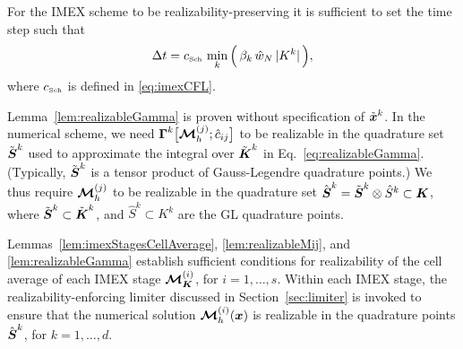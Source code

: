 \begin{rem}
  For the IMEX scheme to be realizability-preserving it is sufficient to set the time step such that
  \begin{equation}
    \Delta t = c_{\mbox{\tiny Sch}}\,\min_{k} \Big(\, \beta_{k}\,\hat{w}_{N}\,|K^{k}| \,\Big),
    \label{eq:imexTimeStep}
  \end{equation}
  where $c_{\mbox{\tiny Sch}}$ is defined in \eqref{eq:imexCFL}.  
\end{rem}

\begin{rem}
  Lemma~\eqref{lem:realizableGamma} is proven without specification of $\tilde{\boldsymbol{x}}^{k}$.  
  In the numerical scheme, we need $\boldsymbol{\Gamma}^{k}\big[\boldsymbol{\mathcal{M}}_{h}^{(j)};\hat{c}_{ij}\big]$ to be realizable in the quadrature set $\tilde{\boldsymbol{S}}^{k}$ used to approximate the integral over $\tilde{\boldsymbol{K}}^{k}$ in Eq.~\eqref{eq:realizableGamma}.  
  (Typically, $\tilde{\boldsymbol{S}}^{k}$ is a tensor product of Gauss-Legendre quadrature points.)  
  We thus require $\boldsymbol{\mathcal{M}}_{h}^{(j)}$ to be realizable in the quadrature set $\hat{\boldsymbol{S}}^{k}=\tilde{\boldsymbol{S}}^{k}\otimes\hat{S}^{k}\subset\boldsymbol{K}$, where $\tilde{\boldsymbol{S}}^{k}\subset\tilde{\boldsymbol{K}}^{k}$, and $\hat{S}^{k}\subset K^{k}$ are the GL quadrature points.  
\end{rem}

\begin{rem}
  Lemmas~\ref{lem:imexStagesCellAverage}, \ref{lem:realizableMij}, and \ref{lem:realizableGamma} establish sufficient conditions for realizability of the cell average of each IMEX stage $\boldsymbol{\mathcal{M}}_{\boldsymbol{K}}^{(i)}$, for $i=1,\ldots,s$.  
  Within each IMEX stage, the realizability-enforcing limiter discussed in Section~\ref{sec:limiter} is invoked to ensure that the numerical solution $\boldsymbol{\mathcal{M}}_{h}^{(i)}(\boldsymbol{x})$ is realizable in the quadrature points $\hat{\boldsymbol{S}}^{k}$, for $k=1,\ldots,d$.  
\end{rem}

